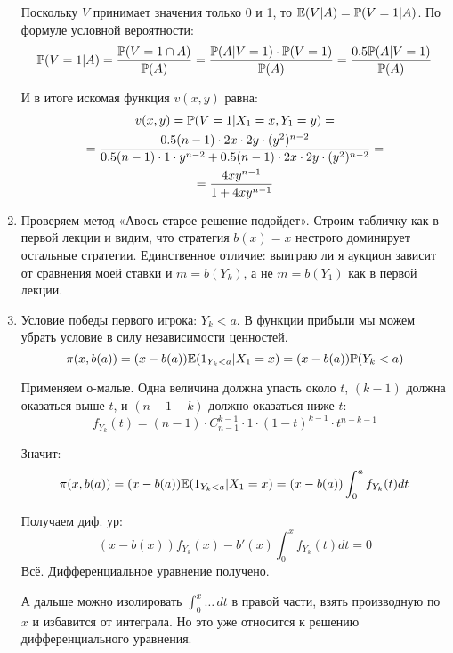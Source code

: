\begin{enumerate}
Поскольку $ V $ принимает значения только 0 и 1, то $ \E(V|A)=\P(V=1|A) $. По формуле условной вероятности:
\begin{equation}
\P(V=1|A)=\frac{\P(V=1 \cap A)}{\P(A)}=\frac{\P(A|V=1)\cdot \P(V=1)}{\P(A)}=\frac{0.5\P(A|V=1)}{\P(A)}
\end{equation}

И в итоге искомая функция $ v(x,y) $ равна:
\begin{multline}
v(x,y)=\P(V=1|X_{1}=x,Y_{1}=y)=\\
=\frac{0.5(n-1)\cdot 2x \cdot 2y\cdot (y^{2})^{n-2}}{0.5(n-1)\cdot 1 \cdot y^{n-2}+0.5(n-1)\cdot 2x \cdot 2y \cdot (y^{2})^{n-2}}=\\
=\frac{4xy^{n-1}}{1+4xy^{n-1}}
\end{multline}

\item Проверяем метод «Авось старое решение подойдет». Строим табличку как в первой лекции и видим, что стратегия $ b(x)=x $ нестрого доминирует остальные стратегии. Единственное отличие: выиграю ли я аукцион зависит от сравнения моей ставки и  $m=b(Y_{k}) $, а не $m=b(Y_{1}) $ как в первой лекции.


\item Условие победы первого игрока: $ Y_{k}<a $. В функции прибыли мы можем убрать условие в силу независимости ценностей.
\begin{equation}
\pi(x,b(a))=(x-b(a))\E(1_{Y_{k}<a}|X_{1}=x)=(x-b(a))\P(Y_{k}<a)
\end{equation}

Применяем о-малые. Одна величина должна упасть около $ t $, $ (k-1) $ должна оказаться выше $ t $, и $ (n-1-k) $ должно оказаться ниже $ t $:
\begin{equation}
f_{Y_{k}}(t)=(n-1)\cdot C_{n-1}^{k-1}\cdot 1\cdot (1-t)^{k-1}\cdot t^{n-k-1}
\end{equation}

Значит:
\begin{equation}
\pi(x,b(a))=(x-b(a))\E(1_{Y_{k}<a}|X_{1}=x)=(x-b(a))\int_{0}^{a}f_{Y_{k}}(t)dt
\end{equation}

Получаем диф. ур:
\begin{equation}
(x-b(x))f_{Y_{k}}(x)-b'(x)\int_{0}^{x}f_{Y_{k}}(t)dt=0
\end{equation}
Всё. Дифференциальное уравнение получено.

А дальше можно изолировать $ \int_{0}^{x}\ldots\, dt $ в правой части, взять производную по $ x $ и избавится от интеграла. Но это уже относится к решению дифференциального уравнения.



\end{enumerate}
